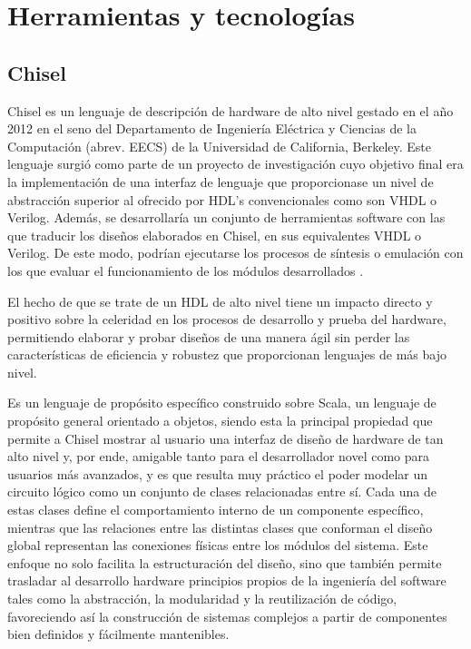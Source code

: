 \chapter{Herramientas y tecnologías}


\section{Chisel}

Chisel es un lenguaje de descripción de hardware de alto nivel gestado en el año 2012 en el seno del Departamento de Ingeniería Eléctrica y Ciencias de la Computación (abrev. EECS) de la Universidad de California, Berkeley. Este lenguaje surgió como parte de un proyecto de investigación cuyo objetivo final era la implementación de una interfaz de lenguaje que proporcionase un nivel de abstracción superior al ofrecido por HDL's convencionales como son VHDL o Verilog. Además, se desarrollaría un conjunto de herramientas software con las que traducir los diseños elaborados en Chisel, en sus equivalentes VHDL o Verilog. De este modo, podrían ejecutarse los procesos de síntesis o emulación con los que evaluar el funcionamiento de los módulos desarrollados \cite{chiselEECS}.

El hecho de que se trate de un HDL de alto nivel tiene un impacto directo y positivo sobre la celeridad en los procesos de desarrollo y prueba del hardware, permitiendo elaborar y probar diseños de una manera ágil sin perder las características de eficiencia y robustez que proporcionan lenguajes de más bajo nivel.

Es un lenguaje de propósito específico construido sobre Scala, un lenguaje de propósito general orientado a objetos, siendo esta la principal propiedad que permite a Chisel mostrar al usuario una interfaz de diseño de hardware de tan alto nivel y, por ende, amigable tanto para el desarrollador novel como para usuarios más avanzados, y es que resulta muy práctico el poder modelar un circuito lógico como un conjunto de clases relacionadas entre sí. Cada una de estas clases define el comportamiento interno de un componente específico, mientras que las relaciones entre las distintas clases que conforman el diseño global representan las conexiones físicas entre los módulos del sistema. Este enfoque no solo facilita la estructuración del diseño, sino que también permite trasladar al desarrollo hardware principios propios de la ingeniería del software tales como la abstracción, la modularidad y la reutilización de código, favoreciendo así la construcción de sistemas complejos a partir de componentes bien definidos y fácilmente mantenibles.

